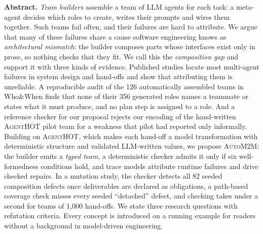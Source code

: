 \documentclass[10pt,a4paper]{article}
\newcommand{\tool}{\textsc{AgentHOT}}
\newcommand{\auto}{\textsc{AutoM2M}}
\begin{document}
\begin{tcolorbox}[enhanced, colback=accentlight, colframe=accentlight, arc=0pt,
   boxrule=0pt, borderline west={2.2pt}{0pt}{accent}, left=10pt, right=10pt,
   top=7pt, bottom=7pt]
{\sffamily\bfseries\color{accent}Abstract.}\enspace
\emph{Team builders} assemble a team of LLM agents for each task: a
meta-agent decides which roles to create, writes their prompts and wires
them together. Such teams fail often, and their failures are hard to
attribute. We argue that many of these failures share a cause software
engineering knows as \emph{architectural mismatch}: the builder composes
parts whose interfaces exist only in prose, so nothing checks that they
fit. We call this the \emph{composition gap} and support it with three
kinds of evidence. Published studies locate most multi-agent failures in
system design and hand-offs and show that attributing them is unreliable.
A reproducible audit of the 126 automatically assembled teams in
Who\&When finds that none of their 356 generated roles names a teammate
or states what it must produce, and no plan step is assigned to a role.
And a reference checker for our proposal rejects our encoding of the
hand-written \tool{} pilot team for a weakness that pilot had reported
only informally. Building on \tool{}, which makes each hand-off a model
transformation with deterministic structure and validated LLM-written
values, we propose \auto{}: the builder emits a \emph{typed team}, a
deterministic checker admits it only if six well-formedness conditions
hold, and trace models attribute runtime failures and drive checked
repairs. In a mutation study, the checker detects all 82 seeded
composition defects once deliverables are declared as obligations, a
path-based coverage check misses every seeded ``detached'' defect, and
checking takes under a second for teams of 1{,}000 hand-offs. We state
three research questions with refutation criteria. Every concept is
introduced on a running example for readers without a background in
model-driven engineering.
\end{tcolorbox}

{\hypersetup{linkcolor=black}
\setcounter{tocdepth}{1}
\makeatletter
\renewcommand*\l@section[2]{\addpenalty{-\@highpenalty}\vskip 0.15em
  {\sffamily\small\@dottedtocline{1}{0em}{2em}{#1}{#2}}}
\renewcommand*\l@subsection[2]{\small\@dottedtocline{2}{2em}{2.6em}{#1}{#2}}
\makeatother
\renewcommand{\contentsname}{\sffamily\color{accent}Contents}
\tableofcontents}

\end{document}
